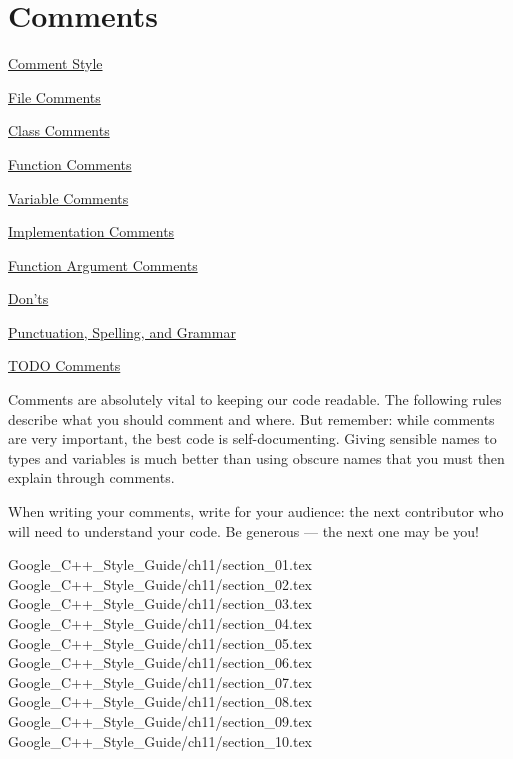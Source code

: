 
\chapter{Comments}\label{ch:comments}

\begin{introduction}
    \item \hyperref[sec:comment-style]{Comment Style}
    \item \hyperref[sec:file-comments]{File Comments}
    \item \hyperref[sec:class-comments]{Class Comments}
    \item \hyperref[sec:function-comments]{Function Comments}
    \item \hyperref[sec:variable-comments]{Variable Comments}
    \item \hyperref[sec:implementation-comments]{Implementation Comments}
    \item \hyperref[sec:function-argument-comments]{Function Argument Comments}
    \item \hyperref[sec:don'ts]{Don'ts}
    \item \hyperref[sec:punctuation-spelling-and-grammar]{Punctuation, Spelling, and Grammar}
    \item \hyperref[sec:todo-comments]{TODO Comments}
\end{introduction}

Comments are absolutely vital to keeping our code readable. The following rules describe what you should comment and where. But remember: while comments are very important, the best code is self-documenting. Giving sensible names to types and variables is much better than using obscure names that you must then explain through comments.

When writing your comments, write for your audience: the next contributor who will need to understand your code. Be generous — the next one may be you!

{Google_C++_Style_Guide/ch11/section_01.tex}
{Google_C++_Style_Guide/ch11/section_02.tex}
{Google_C++_Style_Guide/ch11/section_03.tex}
{Google_C++_Style_Guide/ch11/section_04.tex}
{Google_C++_Style_Guide/ch11/section_05.tex}
{Google_C++_Style_Guide/ch11/section_06.tex}
{Google_C++_Style_Guide/ch11/section_07.tex}
{Google_C++_Style_Guide/ch11/section_08.tex}
{Google_C++_Style_Guide/ch11/section_09.tex}
{Google_C++_Style_Guide/ch11/section_10.tex}
